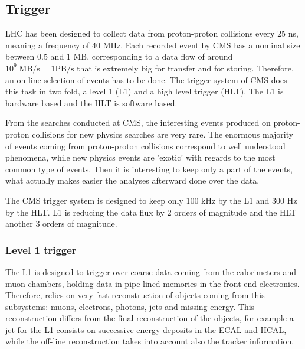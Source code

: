 
\subsection{Trigger}
\label{sec:trigger}

LHC has been designed to collect data from proton-proton collisions every 25 ns, meaning a frequency of 40 MHz. Each recorded event by CMS has a nominal size between 0.5 and 1 MB, corresponding to a data flow of around $10^{9}\; \text{MB/s}= 1\text{PB/s}$ that is extremely big for transfer and for storing. Therefore, an on-line selection of events has to be done. The trigger system of CMS does this task in two fold, a level 1 (L1) and a high level trigger (HLT). The L1 is hardware based and the HLT is software based. 

From the searches conducted at CMS, the interesting events produced on proton-proton collisions for new physics searches are very rare. The enormous majority of events coming from proton-proton collisions correspond to well understood phenomena, while new physics events are 'exotic' with regards to the most common type of events. Then it is interesting to keep only a part of the events, what actually makes easier the analyses afterward done over the data. 

The CMS trigger system is designed to keep only 100 kHz by the L1 and 300 Hz by the HLT. L1 is reducing the data flux by 2 orders of magnitude and the HLT another 3 orders of magnitude.

\subsubsection{Level 1 trigger}
\label{sec:L1}

The L1 is designed to trigger over coarse data coming from the calorimeters and muon chambers, holding data in pipe-lined memories in the front-end electronics. Therefore, relies on very fast reconstruction of objects coming from this subsystems: muons, electrons, photons, jets and missing energy. This reconstruction differs from the final reconstruction of the objects, for example a jet for the L1 consists on successive energy deposits in the ECAL and HCAL, while the off-line reconstruction takes into account also the tracker information. 

